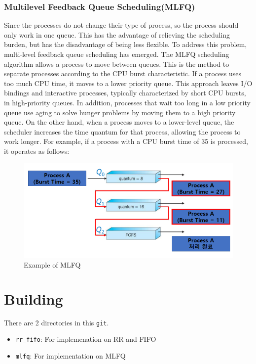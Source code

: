 \documentclass{homework}
\begin{document}
\subsubsection{Multilevel Feedback Queue Scheduling(MLFQ)}
Since the processes do not change their type of process, so the process should only work in one queue. This has the advantage of relieving the scheduling burden, but has the disadvantage of being less flexible. To address this problem, multi-level feedback queue scheduling has emerged. The MLFQ scheduling algorithm allows a process to move between queues. This is the method to separate processes according to the CPU burst characteristic. If a process uses too much CPU time, it moves to a lower priority queue. This approach leaves I/O bindings and interactive processes, typically characterized by short CPU bursts, in high-priority queues. In addition, processes that wait too long in a low priority queue use aging to solve hunger problems by moving them to a high priority queue. On the other hand, when a process moves to a lower-level queue, the scheduler increases the time quantum for that process, allowing the process to work longer. For example, if a process with a CPU burst time of 35 is processed, it operates as follows:

\begin{figure}[h]
\begin{center}
\includegraphics[scale=0.8]{4.png}    
\caption{Example of MLFQ}
\end{center}
\end{figure}


\pagebreak
\section{Building} 
There are 2 directories in this \texttt{git}.
\begin{itemize}
   \item \texttt{rr_fifo}: For implemenation on RR and FIFO
   \item \texttt{mlfq}: For implementation on MLFQ
\end{itemize}
\end{document}
